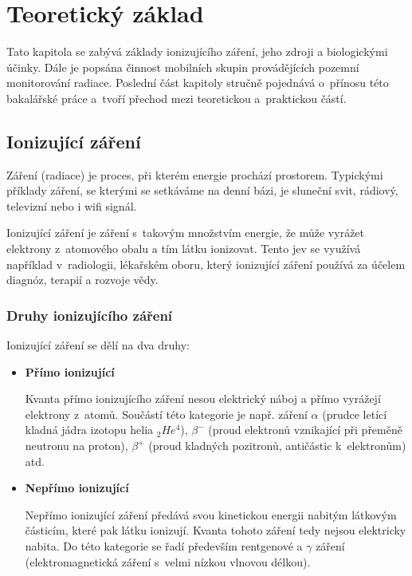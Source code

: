 \chapter{Teoretický základ}
\label{2-teorie} Tato kapitola se zabývá základy ionizujícího záření,
jeho zdroji a biologickými účinky. Dále je popsána činnost mobilních
skupin provádějících pozemní monitorování radiace. Poslední část
kapitoly stručně pojednává o~přínosu této bakalářské práce a~tvoří
přechod mezi teoretickou a~praktickou částí.

\section{Ionizující záření}
	
Záření (radiace) je proces, při kterém energie prochází
prostorem. Typickými příklady záření, se kterými se setkáváme na denní
bázi, je sluneční svit, rádiový, televizní nebo i wifi signál.

Ionizující záření je záření s~takovým množstvím energie, že může
vyrážet elektrony z~atomového obalu a tím látku ionizovat. Tento jev
se využívá například v~radiologii, lékařském oboru, který ionizující
záření používá za účelem diagnóz, terapií a rozvoje vědy. \citep{who}

\subsection{Druhy ionizujícího záření} Ionizující záření se dělí na
dva druhy: \cite{ionZarUllman} \cite{CEZ}

\begin{itemize}
	\item \textbf{Přímo ionizující}
	
		Kvanta přímo ionizujícího záření nesou elektrický
náboj a přímo vyrážejí elektrony z~atomů. Součástí této kategorie je
např. záření $\alpha$ (prudce letící kladná jádra izotopu helia
$_{2}He^{4}$), $\beta^{-}$ (proud elektronů vznikající při přeměně
neutronu na proton), $\beta^{+}$ (proud kladných pozitronů, antičástic
k~elektronům) atd.
		 
	\item \textbf{Nepřímo ionizující}
	
		Nepřímo ionizující záření předává svou kinetickou
energii nabitým látkovým částicím, které pak látku ionizují. Kvanta
tohoto záření tedy nejsou elektricky nabita. Do této kategorie se řadí
především rentgenové a $\gamma$ záření (elektromagnetická záření
s~velmi nízkou vlnovou délkou).
\end{itemize}

